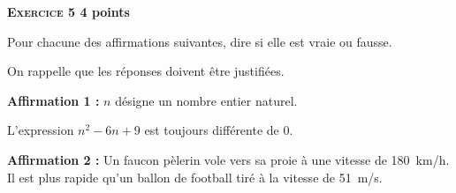 \textbf{\textsc{Exercice 5} \hfill 4 points}

\medskip
 
Pour chacune des affirmations suivantes, dire si elle est vraie ou fausse.

On rappelle que les réponses doivent être justifiées.

\medskip

\textbf{Affirmation 1 :} $n$ désigne un nombre entier naturel.

L'expression $n^2 - 6n + 9$ est toujours différente de $0$.

\smallskip

\textbf{Affirmation 2 :} Un faucon pèlerin vole vers sa proie à une vitesse de 180~km/h. Il est
plus rapide qu'un ballon de football tiré à la vitesse de 51~m/s.
\vspace{0.25cm}

